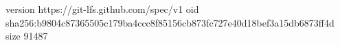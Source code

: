 version https://git-lfs.github.com/spec/v1
oid sha256:b9804c87365505c179ba4ccc8f85156cb873fc727e40d18bef3a15db6873ff4d
size 91487
